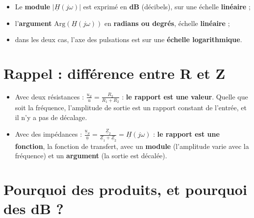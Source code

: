 \begin{defnbox}[title=Règles de dessin]
\begin{itemize}
  \item Le \textbf{module} $|\underline H(j\omega)|$ est exprimé en \textbf{dB} (décibels),
        sur une échelle \textbf{linéaire} ;
  \item l'\textbf{argument} $\mathrm{Arg}(\underline H(j\omega))$ en \textbf{radians ou
        degrés}, échelle \textbf{linéaire} ;
  \item dans les deux cas, l'axe des pulsations est sur une \textbf{échelle
        logarithmique}.
\end{itemize}
\end{defnbox}

\section{Rappel : différence entre R et Z}


\begin{propbox}[title={Diviseur résistif vs fonction de transfert}]
\begin{itemize}
  \item Avec deux résistances : $\frac{u_S}{u} = \frac{R_2}{R_1 + R_2}$ : \textbf{le rapport
        est une valeur}. Quelle que soit la fréquence, l'amplitude de sortie est un rapport
        constant de l'entrée, et il n'y a pas de décalage.
  \item Avec des impédances : $\frac{\underline u_S}{\underline u} = \frac{\underline Z_2}{\underline Z_1 + \underline Z_2} = \underline H(j\omega)$ :
        \textbf{le rapport est une fonction}, la fonction de transfert, avec un
        \textbf{module} (l'amplitude varie avec la fréquence) et un \textbf{argument} (la
        sortie est décalée).
\end{itemize}
\end{propbox}

\section{Pourquoi des produits, et pourquoi des dB ?}


